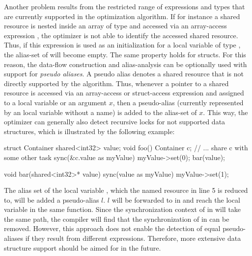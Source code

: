 Another problem results from the restricted range of expressions and types that are currently supported in the optimization algorithm. If for instance a shared resource is nested inside an array  of type  and accessed via an array-access expression , the optimizer is not able to identify the accessed shared resource. Thus, if this expression is used as an initialization for a local variable  of type , the alias-set of  will become empty. The same property holds for structs. For this reason, the data-flow construction and alias-analysis can be optionally used with support for \textit{pseudo aliases}. A pseudo alias denotes a shared resource that is not directly supported by the algorithm. Thus, whenever a pointer to a shared resource is accessed via an array-access or struct-access expression and assigned to a local variable or an argument $x$, then a pseudo-alias (currently represented by an local variable without a name) is added to the alias-set of $x$. This way, the optimizer can generally also detect recursive locks for not supported data structures, which is illustrated by the following example:
\begin{ccode}
struct Container { shared<int32> value; }
void foo() {
  Container c;
  // ... share c with some other task
  sync(&c.value as myValue) {
    myValue->set(0);
    bar(value);
  }
}

void bar(shared<int32>* value) {
  sync(value as myValue) { myValue->set(1); }
}
\end{ccode}
The alias set of the local variable , which the named resource in line 5 is reduced to, will be added a pseudo-alias $l$. $l$ will be forwarded to  in  and reach the local variable  in the same function. Since the synchronization context of  in  will take the same path, the compiler will find that the synchronization of  in  can be removed. However, this approach does not enable the detection of equal pseudo-aliases if they result from different expressions. Therefore, more extensive data structure support should be aimed for in the future.

